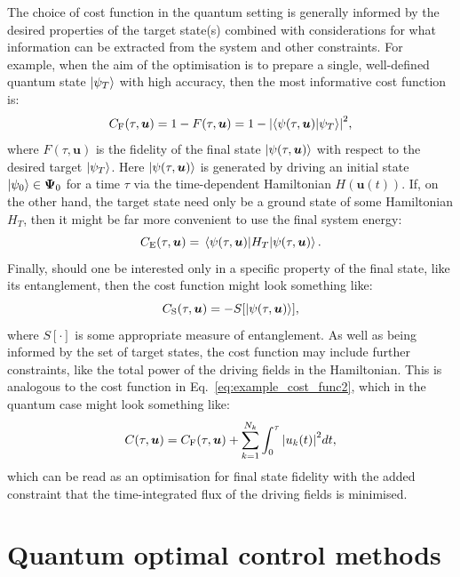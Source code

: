 \documentclass[a4paper,oneside,11pt]{book}
\newcommand{\ubb}{\boldsymbol{u}}
\begin{document}
The choice of cost function in the quantum setting is generally informed by the desired properties of the target state(s) combined with considerations for what information can be extracted from the system and other constraints. For example, when the aim of the optimisation is to prepare a single, well-defined quantum state $\ket{\psi_T}$ with high accuracy, then the most informative cost function is:
\begin{equation}\label{eq:costfunc_fidelity}
    C_{\rm F}(\tau, \ubb) = 1 - F(\tau, \ubb) = 1 - \abs{\braket{\psi(\tau, \ubb)}{\psi_T}}^2,
\end{equation}
where $F(\tau, \ubb)$ is the fidelity of the final state $\ket{\psi(\tau, \ubb)}$ with respect to the desired target $\ket{\psi_T}$. Here $\ket{\psi(\tau, \ubb)}$ is generated by driving an initial state $\ket{\psi_0} \in \boldsymbol \Psi_0$ for a time $\tau$ via the time-dependent Hamiltonian $H(\ubb(t))$. If, on the other hand, the target state need only be a ground state of some Hamiltonian $H_T$, then it might be far more convenient to use the final system energy:
\begin{equation}\label{eq:costfunc_energy}
    C_{\rm E}(\tau, \ubb) = \mel{\psi(\tau, \ubb)}{H_T}{\psi(\tau, \ubb)}.
\end{equation}
Finally, should one be interested only in a specific property of the final state, like its entanglement, then the cost function might look something like:
\begin{equation}\label{eq:costfunc_entanglement}
    C_{\rm S}(\tau, \ubb) = -S[\ket{\psi(\tau, \ubb)}],
\end{equation}
where $S[\cdot]$ is some appropriate measure of entanglement. As well as being informed by the set of target states, the cost function may include further constraints, like the total power of the driving fields in the Hamiltonian. This is analogous to the cost function in Eq.~\eqref{eq:example_cost_func2}, which in the quantum case might look something like:
\begin{equation}\label{eq:costfunc_constraint}
    C(\tau, \ubb) = C_{\rm F}(\tau, \ubb) + \sum_{k = 1}^{N_k} \int_0^{\tau} \abs{u_k(t)}^2 dt,
\end{equation}
which can be read as an optimisation for final state fidelity with the added constraint that the time-integrated flux of the driving fields is minimised. 

\section{Quantum optimal control methods}\label{sec:3.3_qoct_methods}
\end{document}

